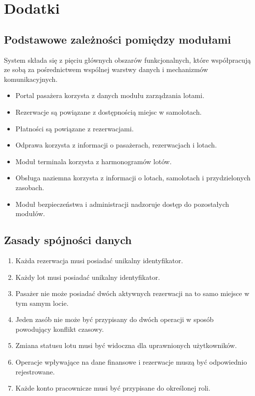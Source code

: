 \documentclass[12pt,a4paper,oneside]{report}
\begin{document}
\chapter{Dodatki}

\section{Podstawowe zależności pomiędzy modułami}
System składa się z pięciu głównych obszarów funkcjonalnych, które współpracują ze sobą za pośrednictwem wspólnej warstwy danych i mechanizmów komunikacyjnych.

\begin{itemize}
    \item Portal pasażera korzysta z danych modułu zarządzania lotami.
    \item Rezerwacje są powiązane z dostępnością miejsc w samolotach.
    \item Płatności są powiązane z rezerwacjami.
    \item Odprawa korzysta z informacji o pasażerach, rezerwacjach i lotach.
    \item Moduł terminala korzysta z harmonogramów lotów.
    \item Obsługa naziemna korzysta z informacji o lotach, samolotach i przydzielonych zasobach.
    \item Moduł bezpieczeństwa i administracji nadzoruje dostęp do pozostałych modułów.
\end{itemize}

\section{Zasady spójności danych}
\begin{enumerate}
    \item Każda rezerwacja musi posiadać unikalny identyfikator.
    \item Każdy lot musi posiadać unikalny identyfikator.
    \item Pasażer nie może posiadać dwóch aktywnych rezerwacji na to samo miejsce w tym samym locie.
    \item Jeden zasób nie może być przypisany do dwóch operacji w sposób powodujący konflikt czasowy.
    \item Zmiana statusu lotu musi być widoczna dla uprawnionych użytkowników.
    \item Operacje wpływające na dane finansowe i rezerwacje muszą być odpowiednio rejestrowane.
    \item Każde konto pracownicze musi być przypisane do określonej roli.
\end{enumerate}
\end{document}
